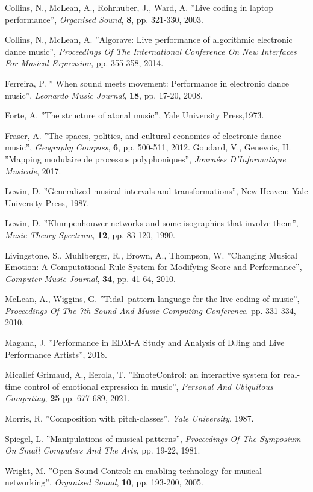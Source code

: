 \documentclass{article}
\begin{document}
\begin{thebibliography}{2}
  Collins, N., McLean, A., Rohrhuber, J., Ward, A. ''Live coding in laptop performance'',
  {\em Organised Sound}, \textbf{8}, pp. 321-330, 2003.

  Collins, N., McLean, A.
  ''Algorave: Live performance of algorithmic electronic dance music'',
  {\em Proceedings Of The International Conference On New Interfaces For Musical Expression}, pp. 355-358, 2014.

  Ferreira, P.
  '' When sound meets movement: Performance in electronic dance music'',
   {\em Leonardo Music Journal}, \textbf{18}, pp. 17-20, 2008.

  Forte, A.
  ''The structure of atonal music'',
  Yale University Press,1973.

  Fraser, A.
  ''The spaces, politics, and cultural economies of electronic dance music'', {\em Geography Compass}, \textbf{6}, pp. 500-511, 2012.
  Goudard, V., Genevois, H.
  ''Mapping modulaire de processus polyphoniques'',
  {\em Journées D'Informatique Musicale}, 2017.

  Lewin, D.
  ''Generalized musical intervals and transformations'',
  New Heaven: Yale University Press, 1987.

  Lewin, D.
  ''Klumpenhouwer networks and some isographies that involve them'',
  {\em Music Theory Spectrum}, \textbf{12}, pp. 83-120, 1990.

  Livingstone, S., Muhlberger, R., Brown, A., Thompson, W.
  ''Changing Musical Emotion: A Computational Rule System for Modifying Score and Performance'',
  {\em Computer Music Journal}, \textbf{34}, pp. 41-64, 2010.

  McLean, A., Wiggins, G.
  ''Tidal–pattern language for the live coding of music'',
  {\em Proceedings Of The 7th Sound And Music Computing Conference}. pp. 331-334, 2010.

  Magana, J.
  ''Performance in EDM-A Study and Analysis of DJing and Live Performance Artists'', 2018.


  Micallef Grimaud, A., Eerola, T.
  ''EmoteControl: an interactive system for real-time control of emotional expression in music'',
  {\em Personal And Ubiquitous Computing}, \textbf{25} pp. 677-689, 2021.

  Morris, R.
  ''Composition with pitch-classes'',
  {\em Yale University}, 1987.

  Spiegel, L.
  ''Manipulations of musical patterns'',
   {\em Proceedings Of The Symposium On Small Computers And The Arts}, pp. 19-22, 1981.

  Wright, M.
  ''Open Sound Control: an enabling technology for musical networking'',
  {\em Organised Sound}, \textbf{10}, pp. 193-200, 2005.

\end{thebibliography}
\end{document}
